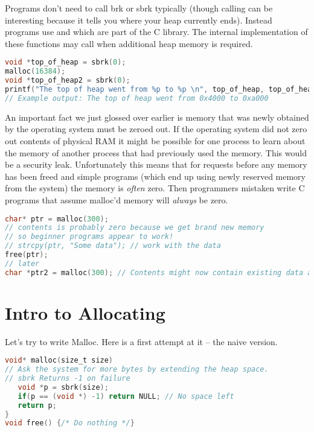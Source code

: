 Programs don't need to call brk or sbrk typically (though calling  can be interesting because it tells you where your heap currently ends).
Instead programs use  and  which are part of the C library.
The internal implementation of these functions may call  when additional heap memory is required.

\begin{lstlisting}[language=C]
void *top_of_heap = sbrk(0);
malloc(16384);
void *top_of_heap2 = sbrk(0);
printf("The top of heap went from %p to %p \n", top_of_heap, top_of_heap2);
// Example output: The top of heap went from 0x4000 to 0xa000
\end{lstlisting}

An important fact we just glossed over earlier is memory that was newly obtained by the operating system must be zeroed out.
If the operating system did not zero out contents of physical RAM it might be possible for one process to learn about the memory of another process that had previously used the memory.
This would be a security leak.
Unfortunately this means that for  requests before any memory has been freed and simple programs (which end up using newly reserved memory from the system) the memory is \emph{often} zero.
Then programmers mistaken write C programs that assume malloc'd memory will \emph{always} be zero.

\begin{lstlisting}[language=C]
char* ptr = malloc(300);
// contents is probably zero because we get brand new memory
// so beginner programs appear to work!
// strcpy(ptr, "Some data"); // work with the data
free(ptr);
// later
char *ptr2 = malloc(300); // Contents might now contain existing data and is probably not zero
\end{lstlisting}

\section{Intro to Allocating}

Let's try to write Malloc.
Here is a first attempt at it -- the naive version.

\begin{lstlisting}[language=C]
void* malloc(size_t size)
// Ask the system for more bytes by extending the heap space.
// sbrk Returns -1 on failure
   void *p = sbrk(size);
   if(p == (void *) -1) return NULL; // No space left
   return p;
}
void free() {/* Do nothing */}
\end{lstlisting}

